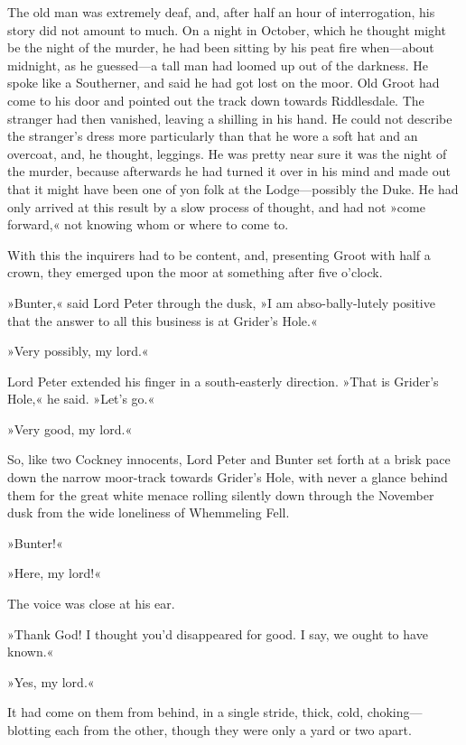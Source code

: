 The old man was extremely deaf, and, after half an hour of interrogation, his story did not amount to much. On a night in October, which he thought might be the night of the murder, he had been sitting by his peat fire when\allowbreak---\allowbreak about midnight, as he guessed\allowbreak---\allowbreak a tall man had loomed up out of the darkness. He spoke like a Southerner, and said he had got lost on the moor. Old Groot had come to his door and pointed out the track down towards Riddlesdale. The stranger had then vanished, leaving a shilling in his hand. He could not describe the stranger's dress more particularly than that he wore a soft hat and an overcoat, and, he thought, leggings. He was pretty near sure it was the night of the murder, because afterwards he had turned it over in his mind and made out that it might have been one of yon folk at the Lodge\allowbreak---\allowbreak possibly the Duke. He had only arrived at this result by a slow process of thought, and had not »come forward,« not knowing whom or where to come to.

With this the inquirers had to be content, and, presenting Groot with half a crown, they emerged upon the moor at something after five o'clock.

»Bunter,« said Lord Peter through the dusk, »I am abso-bally-lutely positive that the answer to all this business is at Grider's Hole.«

»Very possibly, my lord.«

Lord Peter extended his finger in a south-easterly direction. »That is Grider's Hole,« he said. »Let's go.«

»Very good, my lord.«

So, like two Cockney innocents, Lord Peter and Bunter set forth at a brisk pace down the narrow moor-track towards Grider's Hole, with never a glance behind them for the great white menace rolling silently down through the November dusk from the wide loneliness of Whemmeling Fell.

»Bunter!«

»Here, my lord!«

The voice was close at his ear.

»Thank God! I thought you'd disappeared for good. I say, we ought to have known.«

»Yes, my lord.«

It had come on them from behind, in a single stride, thick, cold, choking\allowbreak---\allowbreak blotting each from the other, though they were only a yard or two apart.

